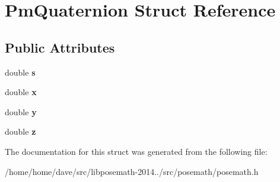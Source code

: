 \hypertarget{structPmQuaternion}{}\section{Pm\+Quaternion Struct Reference}
\label{structPmQuaternion}
\subsection*{Public Attributes}
\begin{DoxyCompactItemize}
\item 
\hypertarget{structPmQuaternion_abff23016cfafd41abab7e0791816f15c}{}double {\bfseries s}\label{structPmQuaternion_abff23016cfafd41abab7e0791816f15c}

\item 
\hypertarget{structPmQuaternion_a84b05f2af41e52cfc051d77c6cc53234}{}double {\bfseries x}\label{structPmQuaternion_a84b05f2af41e52cfc051d77c6cc53234}

\item 
\hypertarget{structPmQuaternion_a6d683884d3ff0ba53f1af36151e465b2}{}double {\bfseries y}\label{structPmQuaternion_a6d683884d3ff0ba53f1af36151e465b2}

\item 
\hypertarget{structPmQuaternion_a5dce4b60d3650e811e50d782320ffaae}{}double {\bfseries z}\label{structPmQuaternion_a5dce4b60d3650e811e50d782320ffaae}

\end{DoxyCompactItemize}


The documentation for this struct was generated from the following file\+:\begin{DoxyCompactItemize}
\item 
/home/home/dave/src/libposemath-\/2014../src/posemath/posemath.\+h\end{DoxyCompactItemize}
